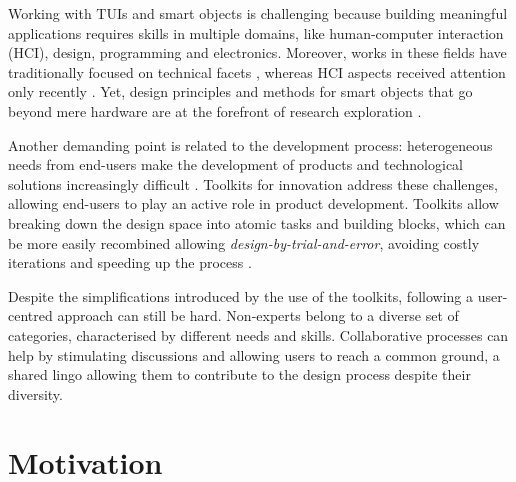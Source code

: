 Working with TUIs and smart objects is challenging because building meaningful applications requires skills in multiple domains, like human-computer interaction (HCI), design, programming and electronics. Moreover, works in these fields have traditionally focused on technical facets \autocite{siegemund_context-aware_2004}, whereas HCI aspects received attention only recently \autocite{nelson_user_2005}. Yet, design principles and methods for smart objects that go beyond mere hardware are at the forefront of research exploration \autocite{kortuem_smart_2010}.

Another demanding point is related to the development process: heterogeneous needs from end-users make the development of products and technological solutions increasingly difficult \autocite{von_hippel_user_2001}. Toolkits for innovation address these challenges, allowing end-users to play an active role in product development. Toolkits allow breaking down the design space into atomic tasks and building blocks, which can be more easily recombined allowing \textit{design-by-trial-and-error}, avoiding costly iterations and speeding up the process \autocite{cvijikj_toolkit_2011}.

Despite the simplifications introduced by the use of the toolkits, following a user-centred approach can still be hard. Non-experts belong to a diverse set of categories, characterised by different needs and skills. Collaborative processes can help by stimulating discussions and allowing users to reach a common ground, a shared lingo allowing them to contribute to the design process despite their diversity.


\section{Motivation}
\label{sec:motivation}

